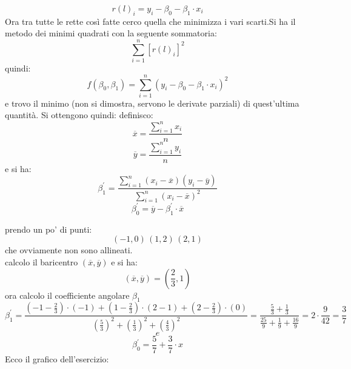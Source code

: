 \documentclass[a4paper,12pt, oneside]{book}
\begin{document}
$$r(l)_i=y_i-\beta_0-\beta_1\cdot x_i$$
Ora tra tutte le rette così fatte cerco quella che minimizza i vari scarti.Si ha il metodo dei minimi quadrati con la seguente sommatoria:
$$\sum_{i=1}^n [r(l)_i]^2$$
quindi:
$$f(\beta_0,\beta_1)=\sum_{i=1}^n(y_i-\beta_0-\beta_1\cdot x_i)^2$$
e trovo il minimo (non si dimostra, servono le derivate parziali) di quest'ultima quantità. Si ottengono quindi:
definisco:
$$\overline{x}=\frac{\sum_{i=1}^n x_i}{n}$$
$$\overline{y}=\frac{\sum_{i=1}^n y_i}{n}$$
e si ha:
$$\beta_1^{'}=\frac{\sum_{i=1}^n (x_i-\overline{x})(y_i-\overline{y})}{\sum_{i=1}^n (x_i-\overline{x})^2}$$
$$\beta_0^{'}=\overline{y}-\beta_1^{'}\cdot \overline{x}$$
\newpage
\begin{esempio}
	prendo un po' di punti:
	$$(-1,0)\,(1,2)\,(2,1)$$
	che ovviamente non sono allineati.\\
	calcolo il baricentro $(\overline{x},\overline{y})$
	e si ha:
	$$(\overline{x},\overline{y})=\left(\frac{2}{3},1\right)$$
	ora calcolo il coefficiente angolare $\beta_1$
	$$\beta_1^{'}=\frac{(-1-\frac{2}{3})\cdot (-1)+(1-\frac{2}{3})\cdot(2-1)+(2-\frac{2}{3})\cdot(0)}{\left(\frac{5}{3}\right)^2+\left(\frac{1}{3}\right)^2+\left(\frac{4}{3}\right)^2}=\frac{\frac{5}{3}+\frac{1}{3}}{\frac{25}{9}+\frac{1}{9}+\frac{16}{9}}=2\cdot\frac{9}{42}=\frac{3}{7}$$
	$$e$$
	$$\beta_0^{'}=\frac{5}{7}+\frac{3}{7}\cdot x$$
	Ecco il grafico dell'esercizio:
	\begin{center}
	\end{center}
\end{esempio}
\newpage
\end{document}
